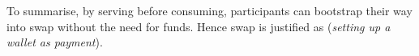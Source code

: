 % 
% 
%

To summarise, by serving before consuming, participants can bootstrap their way into swap without the need for funds. Hence swap is justified as (\emph{setting up a wallet as payment}).
